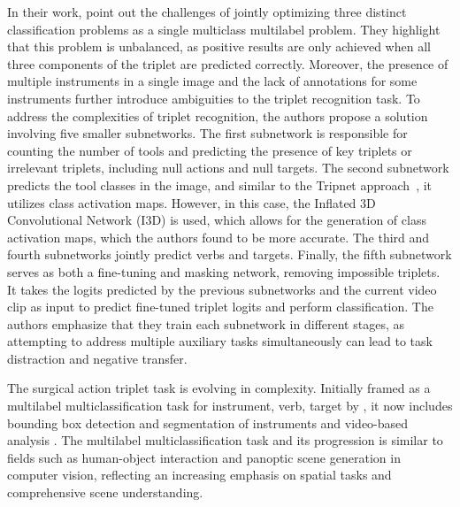 \documentclass[times,twocolumn,final]{elsarticle}
\begin{document}
\indent In their work, \citet{chen2023surgical} point out the challenges of jointly optimizing three distinct classification problems as a single multiclass multilabel problem. They highlight that this problem is unbalanced, as positive results are only achieved when all three components of the triplet are predicted correctly. Moreover, the presence of multiple instruments in a single image and the lack of annotations for some instruments further introduce ambiguities to the triplet recognition task.
To address the complexities of triplet recognition, the authors propose a solution involving five smaller subnetworks. The first subnetwork is responsible for counting the number of tools and predicting the presence of key triplets or irrelevant triplets, including null actions and null targets.
The second subnetwork predicts the tool classes in the image, and similar to the Tripnet approach~\citep{1nywoye_rec_action_triplets}, it utilizes class activation maps. However, in this case, the Inflated 3D Convolutional Network (I3D) \citep{carreira2017quo} is used, which allows for the generation of class activation maps, which the authors found to be more accurate.
The third and fourth subnetworks jointly predict verbs and targets. Finally, the fifth subnetwork serves as both a fine-tuning and masking network, removing impossible triplets. It takes the logits predicted by the previous subnetworks and the current video clip as input to predict fine-tuned triplet logits and perform classification.
The authors emphasize that they train each subnetwork in different stages, as attempting to address multiple auxiliary tasks simultaneously can lead to task distraction and negative transfer. 

The surgical action triplet task is evolving in complexity. Initially framed as a multilabel multiclassification task for \textlangle{}instrument, verb, target\textrangle{} by \citet{1nywoye_rec_action_triplets, NWOYE2022102433_rendevous}, it now includes bounding box detection and segmentation of instruments \citep{sharma2023surgical} and video-based analysis \citep{1nywoye_rec_action_triplets}. The multilabel multiclassification task and its progression is similar to fields such as human-object interaction \citep{kim2021hotr} and panoptic scene generation \citep{yang2022panoptic} in computer vision, reflecting an increasing emphasis on spatial tasks and comprehensive scene understanding.
\end{document}
